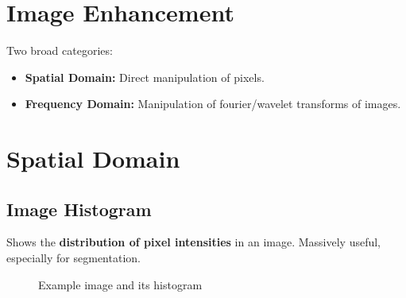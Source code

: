 \section*{Image Enhancement}

Two broad categories:

\begin{itemize}
    \item \textbf{Spatial Domain:} Direct manipulation of pixels.
    \item \textbf{Frequency Domain:} Manipulation of fourier/wavelet transforms of images.
\end{itemize}

\section*{Spatial Domain}

\subsection*{Image Histogram}

Shows the \textbf{distribution of pixel intensities} in an image. Massively useful, especially for segmentation.

\begin{figure}[H]
    \centering
    \caption{Example image and its histogram}
\end{figure}

